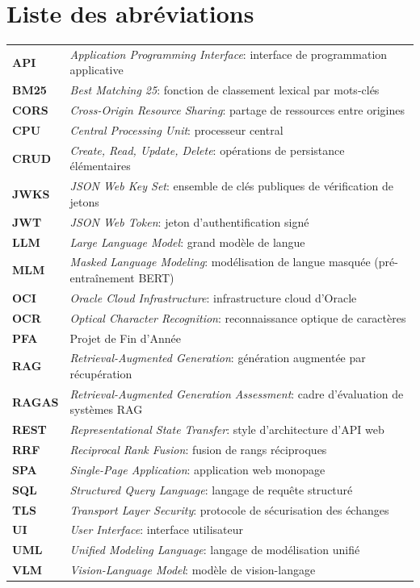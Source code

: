 \cleardoublepage
\chapter*{Liste des abréviations}

\begin{longtable}{@{}p{2.6cm}p{12.2cm}@{}}
\textbf{API} & \emph{Application Programming Interface}: interface de programmation applicative \\
\textbf{BM25} & \emph{Best Matching 25}: fonction de classement lexical par mots-clés \\
\textbf{CORS} & \emph{Cross-Origin Resource Sharing}: partage de ressources entre origines \\
\textbf{CPU} & \emph{Central Processing Unit}: processeur central \\
\textbf{CRUD} & \emph{Create, Read, Update, Delete}: opérations de persistance élémentaires \\
\textbf{JWKS} & \emph{JSON Web Key Set}: ensemble de clés publiques de vérification de jetons \\
\textbf{JWT} & \emph{JSON Web Token}: jeton d'authentification signé \\
\textbf{LLM} & \emph{Large Language Model}: grand modèle de langue \\
\textbf{MLM} & \emph{Masked Language Modeling}: modélisation de langue masquée (pré-entraînement BERT) \\
\textbf{OCI} & \emph{Oracle Cloud Infrastructure}: infrastructure cloud d'Oracle \\
\textbf{OCR} & \emph{Optical Character Recognition}: reconnaissance optique de caractères \\
\textbf{PFA} & Projet de Fin d'Année \\
\textbf{RAG} & \emph{Retrieval-Augmented Generation}: génération augmentée par récupération \\
\textbf{RAGAS} & \emph{Retrieval-Augmented Generation Assessment}: cadre d'évaluation de systèmes RAG \\
\textbf{REST} & \emph{Representational State Transfer}: style d'architecture d'API web \\
\textbf{RRF} & \emph{Reciprocal Rank Fusion}: fusion de rangs réciproques \\
\textbf{SPA} & \emph{Single-Page Application}: application web monopage \\
\textbf{SQL} & \emph{Structured Query Language}: langage de requête structuré \\
\textbf{TLS} & \emph{Transport Layer Security}: protocole de sécurisation des échanges \\
\textbf{UI} & \emph{User Interface}: interface utilisateur \\
\textbf{UML} & \emph{Unified Modeling Language}: langage de modélisation unifié \\
\textbf{VLM} & \emph{Vision-Language Model}: modèle de vision-langage \\
\end{longtable}
